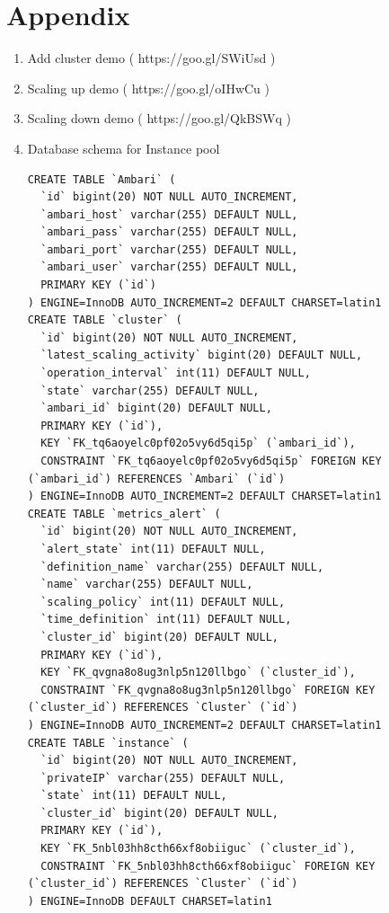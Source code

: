 \documentclass{article}
\begin{document}
\section{Appendix}



\begin{enumerate}

\item Add cluster demo ( https://goo.gl/SWiUsd )
\item Scaling up demo ( https://goo.gl/oIHwCu )
\item Scaling down demo ( https://goo.gl/QkBSWq )

\item Database schema for Instance pool
\begin{lstlisting}
CREATE TABLE `Ambari` (
  `id` bigint(20) NOT NULL AUTO_INCREMENT,
  `ambari_host` varchar(255) DEFAULT NULL,
  `ambari_pass` varchar(255) DEFAULT NULL,
  `ambari_port` varchar(255) DEFAULT NULL,
  `ambari_user` varchar(255) DEFAULT NULL,
  PRIMARY KEY (`id`)
) ENGINE=InnoDB AUTO_INCREMENT=2 DEFAULT CHARSET=latin1 
CREATE TABLE `cluster` (
  `id` bigint(20) NOT NULL AUTO_INCREMENT,
  `latest_scaling_activity` bigint(20) DEFAULT NULL,
  `operation_interval` int(11) DEFAULT NULL,
  `state` varchar(255) DEFAULT NULL,
  `ambari_id` bigint(20) DEFAULT NULL,
  PRIMARY KEY (`id`),
  KEY `FK_tq6aoyelc0pf02o5vy6d5qi5p` (`ambari_id`),
  CONSTRAINT `FK_tq6aoyelc0pf02o5vy6d5qi5p` FOREIGN KEY (`ambari_id`) REFERENCES `Ambari` (`id`)
) ENGINE=InnoDB AUTO_INCREMENT=2 DEFAULT CHARSET=latin1 
CREATE TABLE `metrics_alert` (
  `id` bigint(20) NOT NULL AUTO_INCREMENT,
  `alert_state` int(11) DEFAULT NULL,
  `definition_name` varchar(255) DEFAULT NULL,
  `name` varchar(255) DEFAULT NULL,
  `scaling_policy` int(11) DEFAULT NULL,
  `time_definition` int(11) DEFAULT NULL,
  `cluster_id` bigint(20) DEFAULT NULL,
  PRIMARY KEY (`id`),
  KEY `FK_qvgna8o8ug3nlp5n120llbgo` (`cluster_id`),
  CONSTRAINT `FK_qvgna8o8ug3nlp5n120llbgo` FOREIGN KEY (`cluster_id`) REFERENCES `Cluster` (`id`)
) ENGINE=InnoDB AUTO_INCREMENT=2 DEFAULT CHARSET=latin1 
CREATE TABLE `instance` (
  `id` bigint(20) NOT NULL AUTO_INCREMENT,
  `privateIP` varchar(255) DEFAULT NULL,
  `state` int(11) DEFAULT NULL,
  `cluster_id` bigint(20) DEFAULT NULL,
  PRIMARY KEY (`id`),
  KEY `FK_5nbl03hh8cth66xf8obiiguc` (`cluster_id`),
  CONSTRAINT `FK_5nbl03hh8cth66xf8obiiguc` FOREIGN KEY (`cluster_id`) REFERENCES `Cluster` (`id`)
) ENGINE=InnoDB DEFAULT CHARSET=latin1
\end{lstlisting}

\end{enumerate}
\end{document}
